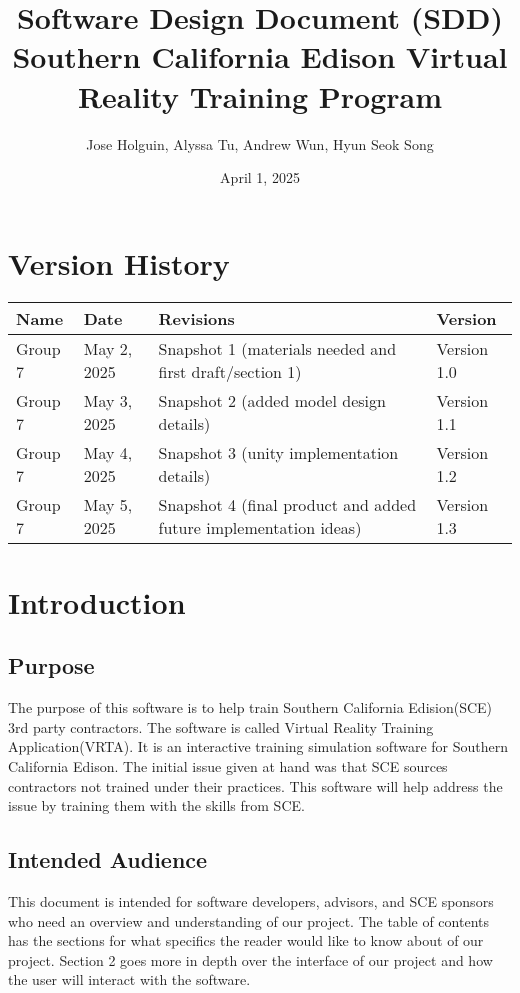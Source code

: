 \documentclass[12pt]{article}
\title{\textbf{Software Design Document (SDD)} \\ \vspace{0.5cm} \large Southern California Edison Virtual Reality Training Program}
\author{Jose Holguin, Alyssa Tu, Andrew Wun, Hyun Seok Song}
\date{April 1, 2025}
\begin{document}
\maketitle
\newpage

\tableofcontents
\newpage

\section*{Version History}
\begin{longtable}{|p{1.5cm}|p{2cm}|p{3.5cm}|p{2cm}|}
\hline
\textbf{Name} & \textbf{Date} & \textbf{Revisions} & \textbf{Version} \\
\hline
Group 7 & May 2, 2025 & Snapshot 1 (materials needed and first draft/section 1) & Version 1.0 \\
\hline
Group 7 & May 3, 2025 & Snapshot 2 (added model design details) & Version 1.1 \\
\hline
Group 7 & May 4, 2025 & Snapshot 3 (unity implementation details) & Version 1.2 \\
\hline
Group 7 & May 5, 2025 & Snapshot 4 (final product and added future implementation ideas) & Version 1.3 \\
\hline
\end{longtable}
\newpage


\section{Introduction}
\subsection{Purpose}
The purpose of this software is to help train Southern California Edision(SCE) 3rd party contractors. 
The software is called Virtual Reality Training Application(VRTA).
It is an interactive training simulation software for Southern California Edison. 
The initial issue given at hand was that SCE sources contractors not trained under their practices. 
This software will help address the issue by training them with the skills from SCE.

\subsection{Intended Audience}
This document is intended for software developers, advisors, and SCE sponsors who need an overview and understanding of our project. 
The table of contents has the sections for what specifics the reader would like to know about of our project. 
Section 2 goes more in depth over the interface of our project and how the user will interact with the software.
\end{document}
